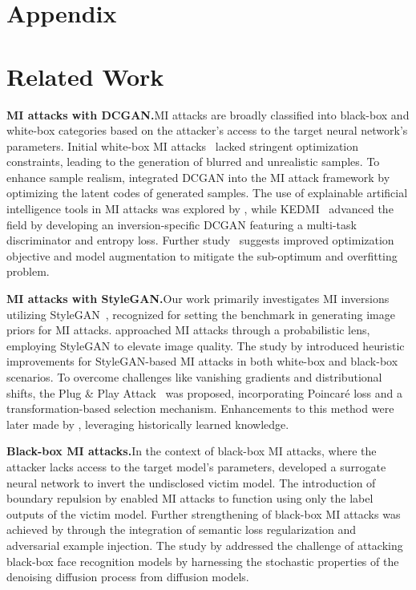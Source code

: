 \appendix


\section*{Appendix}

\section{Related Work}
\label{related}
\textbf{MI attacks with DCGAN.}\quad MI attacks are broadly classified into black-box and white-box categories based on the attacker's access to the target neural network's parameters.
Initial white-box MI attacks~\cite{mi15} lacked stringent optimization constraints, leading to the generation of blurred and unrealistic samples.
To enhance sample realism, \cite{gmi20cvpr} integrated DCGAN into the MI attack framework by optimizing the latent codes of generated samples.
The use of explainable artificial intelligence tools in MI attacks was explored by \cite{xai21iccv}, while KEDMI~\cite{kedmi21iccv} advanced the field by developing an inversion-specific DCGAN featuring a multi-task discriminator and entropy loss.
Further study~\cite{rethink23cvpr} suggests improved optimization objective and model augmentation to mitigate the sub-optimum and overfitting problem.

\noindent
\textbf{MI attacks with StyleGAN.}\quad Our work primarily investigates MI inversions utilizing StyleGAN~\cite{stylegan2_20cvpr}, recognized for setting the benchmark in generating image priors for MI attacks.
\cite{vmi21nips} approached MI attacks through a probabilistic lens, employing StyleGAN to elevate image quality.
The study by \cite{mirror22ndss} introduced heuristic improvements for StyleGAN-based MI attacks in both white-box and black-box scenarios.
To overcome challenges like vanishing gradients and distributional shifts, the Plug \& Play Attack~\cite{ppa22icml} was proposed, incorporating Poincar\'e loss and a transformation-based selection mechanism.
Enhancements to this method were later made by \cite{mi23mm}, leveraging historically learned knowledge.

\noindent
\textbf{Black-box MI attacks.}\quad In the context of black-box MI attacks, where the attacker lacks access to the target model's parameters, \cite{blackbox19ccs} developed a surrogate neural network to invert the undisclosed victim model. The introduction of boundary repulsion by \cite{blackbox22cvpr} enabled MI attacks to function using only the label outputs of the victim model. Further strengthening of black-box MI attacks was achieved by \cite{blackbox23tdsc} through the integration of semantic loss regularization and adversarial example injection. The study by \cite{mi23iccvw} addressed the challenge of attacking black-box face recognition models by harnessing the stochastic properties of the denoising diffusion process from diffusion models.

